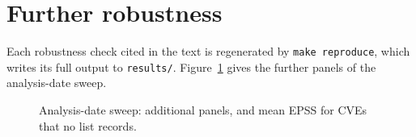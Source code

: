 \section{Further robustness}\label{app:robust}

Each robustness check cited in the text is regenerated by \texttt{make
reproduce}, which writes its full output to \texttt{results/}.
Figure~\ref{fig:sweepapp} gives the further panels of the analysis-date sweep.

\begin{figure}[tb]
\centering
{}
\caption{Analysis-date sweep: additional panels, and mean EPSS for CVEs that
no list records.}\label{fig:sweepapp}
\end{figure}

